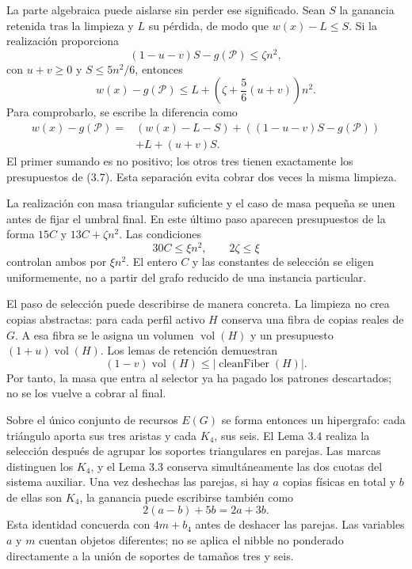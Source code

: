 \documentclass[spanish,11pt,a4paper]{article}
\begin{document}
La parte algebraica puede aislarse sin perder ese significado. Sean \(S\) la ganancia retenida tras la limpieza y \(L\) su pérdida, de modo que \(w(x)-L\le S\). Si la realización proporciona \[
(1-u-v)S-g(\mathcal P)\le\zeta n^2,
\] con \(u+v\ge0\) y \(S\le5n^2/6\), entonces \[
w(x)-g(\mathcal P)
\le L+\left(\zeta+\frac56(u+v)\right)n^2.
\tag{3.7}
\] Para comprobarlo, se escribe la diferencia como \[
\begin{aligned}
w(x)-g(\mathcal P)
={}&(w(x)-L-S)+((1-u-v)S-g(\mathcal P))\\
&+L+(u+v)S.
\end{aligned}
\] El primer sumando es no positivo; los otros tres tienen exactamente los presupuestos de (3.7). Esta separación evita cobrar dos veces la misma limpieza.

La realización con masa triangular suficiente y el caso de masa pequeña se unen antes de fijar el umbral final. En este último paso aparecen presupuestos de la forma \(15C\) y \(13C+\zeta n^2\). Las condiciones \[
30C\le\xi n^2,\qquad 2\zeta\le\xi
\] controlan ambos por \(\xi n^2\). El entero \(C\) y las constantes de selección se eligen uniformemente, no a partir del grafo reducido de una instancia particular.

El paso de selección puede describirse de manera concreta. La limpieza no crea copias abstractas: para cada perfil activo \(H\) conserva una fibra de copias reales de \(G\). A esa fibra se le asigna un volumen \(\operatorname{vol}(H)\) y un presupuesto \((1+u)\operatorname{vol}(H)\). Los lemas de retención demuestran \[
(1-v)\operatorname{vol}(H)
\le |\operatorname{cleanFiber}(H)|.
\tag{3.8}
\] Por tanto, la masa que entra al selector ya ha pagado los patrones descartados; no se los vuelve a cobrar al final.

Sobre el único conjunto de recursos \(E(G)\) se forma entonces un hipergrafo: cada triángulo aporta sus tres aristas y cada \(K_4\), sus seis. El Lema 3.4 realiza la selección después de agrupar los soportes triangulares en parejas. Las marcas distinguen los \(K_4\), y el Lema 3.3 conserva simultáneamente las dos cuotas del sistema auxiliar. Una vez deshechas las parejas, si hay \(a\) copias físicas en total y \(b\) de ellas son \(K_4\), la ganancia puede escribirse también como \[
2(a-b)+5b=2a+3b.
\tag{3.9}
\] Esta identidad concuerda con \(4m+b_4\) antes de deshacer las parejas. Las variables \(a\) y \(m\) cuentan objetos diferentes; no se aplica el nibble no ponderado directamente a la unión de soportes de tamaños tres y seis.
\end{document}
